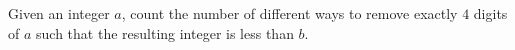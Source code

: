 Given an integer $a$, count the number of different ways to remove exactly $4$ digits of $a$ such that the resulting integer is less than $b$.

